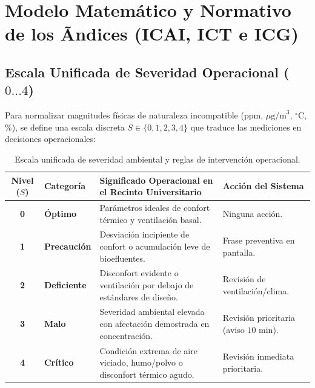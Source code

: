\documentclass[11pt,a4paper]{article}
\begin{document}
\clearpage

\section{Modelo Matemático y Normativo de los Ãndices (ICAI, ICT e ICG)}

\subsection{Escala Unificada de Severidad Operacional (\texorpdfstring{$0 \dots 4$}{0 a 4})}
Para normalizar magnitudes físicas de naturaleza incompatible ($\text{ppm}$, $\mu\text{g/m}^3$, $^\circ\text{C}$, $\%$), se define una escala discreta $S \in \{0,1,2,3,4\}$ que traduce las mediciones en decisiones operacionales:

\begin{table}[H]
\centering
\small
\renewcommand{\arraystretch}{1.2}
\begin{tabularx}{\linewidth}{c l X l}
\toprule
\textbf{Nivel ($S$)} & \textbf{Categoría} & \textbf{Significado Operacional en el Recinto Universitario} & \textbf{Acción del Sistema} \\
\midrule
\textbf{0} & \textbf{Óptimo} & Parámetros ideales de confort térmico y ventilación basal. & Ninguna acción. \\
\textbf{1} & \textbf{Precaución} & Desviación incipiente de confort o acumulación leve de bioefluentes. & Frase preventiva en pantalla. \\
\textbf{2} & \textbf{Deficiente} & Disconfort evidente o ventilación por debajo de estándares de diseño. & Revisión de ventilación/clima. \\
\textbf{3} & \textbf{Malo} & Severidad ambiental elevada con afectación demostrada en concentración. & Revisión prioritaria (aviso $10\text{ min}$). \\
\textbf{4} & \textbf{Crítico} & Condición extrema de aire viciado, humo/polvo o disconfort térmico agudo. & Revisión inmediata prioritaria. \\
\bottomrule
\end{tabularx}
\caption{Escala unificada de severidad ambiental y reglas de intervención operacional.}
\label{tab:escala_severidad}
\end{table}
\end{document}
